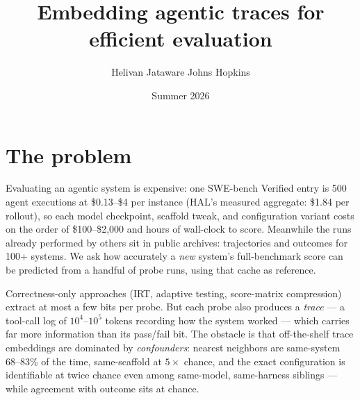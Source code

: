 \documentclass[10pt,twocolumn]{article}
\title{\vspace{-1.2em}\textbf{Embedding agentic traces for efficient evaluation}}
\author{Helivan \quad Jataware \quad Johns Hopkins}
\date{Summer 2026}
\begin{document}
\maketitle

\section*{The problem}
Evaluating an agentic system is expensive: one SWE-bench Verified entry is
500 agent executions at \$0.13--\$4 per instance (HAL's measured aggregate:
\$1.84 per rollout), so each model checkpoint, scaffold tweak, and
configuration variant costs on the order of \$100--\$2{,}000 and hours of
wall-clock to score. Meanwhile the runs already performed by others sit in
public archives: trajectories and outcomes for 100+ systems. We ask how
accurately a \emph{new} system's full-benchmark score can be predicted from
a handful of probe runs, using that cache as reference.

Correctness-only approaches (IRT, adaptive testing, score-matrix
compression) extract at most a few bits per probe. But each probe also
produces a \emph{trace} --- a tool-call log of $10^4$--$10^5$ tokens
recording how the system worked --- which carries far more information
than its pass/fail bit. The obstacle is that off-the-shelf trace
embeddings are dominated by \emph{confounders}: nearest neighbors are
same-system 68--83\% of the time, same-scaffold at $5\times$ chance, and
the exact configuration is identifiable at twice chance even among
same-model, same-harness siblings --- while agreement with outcome sits at
chance.
\end{document}
